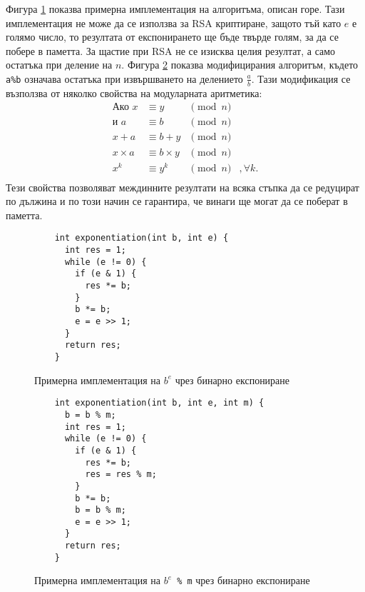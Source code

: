   Фигура \ref{fig:binexp} показва примерна имплементация на алгоритъма, описан горе. Тази имплементация не може да се използва за RSA криптиране, защото тъй като $e$ е голямо число, то резултата от експонирането ще бъде твърде голям, за да се побере в паметта. За щастие при RSA не се изисква целия резултат, а само остатъка при деление на $n$. Фигура \ref{fig:binmodexp} показва модифицирания алгоритъм, където {\tt a\%b} означава остатъка при извършването на делението $\frac{a}{b}$. Тази модификация се възползва от няколко свойства на модуларната аритметика:
  \begin{equation}
    \begin{alignedat}{3}
      \textrm{Ако } x &\equiv y &\pmod{n}  \\
      \textrm{и } a &\equiv b &\pmod{n} \\
      \hline
      x + a &\equiv b + y &\pmod{n} \\
      x \times a &\equiv b \times y &\pmod{n} \\
      x^k &\equiv y^k &\pmod{n}&, \forall k. \\
    \end{alignedat}
    \label{modular-arithmetic-properties}
  \end{equation}
  Тези свойства позволяват междинните резултати на всяка стъпка да се редуцират по дължина и по този начин се гарантира, че винаги ще могат да се поберат в паметта.

  \begin{figure}[htpb]
    \caption{Примерна имплементация на $b^e$ чрез бинарно експониране}
    \label{fig:binexp}
    \begin{verbatim}
    int exponentiation(int b, int e) {
      int res = 1;
      while (e != 0) {
        if (e & 1) {
          res *= b;
        }
        b *= b;
        e = e >> 1;
      }
      return res;
    }
    \end{verbatim}
  \end{figure}

  \begin{figure}[htpb]
    \caption{Примерна имплементация на {\tt $b^e$ \% m} чрез бинарно експониране}
    \label{fig:binmodexp}
    \begin{verbatim}
    int exponentiation(int b, int e, int m) {
      b = b % m;
      int res = 1;
      while (e != 0) {
        if (e & 1) {
          res *= b;
          res = res % m;
        }
        b *= b;
        b = b % m;
        e = e >> 1;
      }
      return res;
    }
    \end{verbatim}
  \end{figure}

